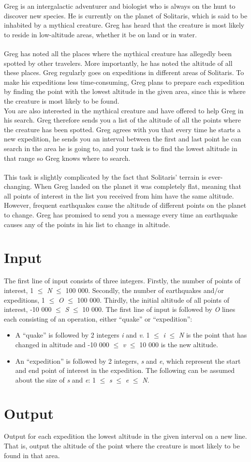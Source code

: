 Greg is an intergalactic adventurer and biologist who is always on the hunt to discover new species. He is currently on the planet of Solitaris, which is said to be inhabited by a mythical creature. Greg has heard that the creature is most likely to reside in low-altitude areas, whether it be on land or in water.
\\\\
Greg has noted all the places where the mythical creature has allegedly been spotted by other travelers. More importantly, he has noted the altitude of all these places. Greg regularly goes on expeditions in different areas of Solitaris. To make his expeditions less time-consuming, Greg plans to prepare each expedition by finding the point with the lowest altitude in the given area, since this is where the creature is most likely to be found. 
\\
You are also interested in the mythical creature and have offered to help Greg in his search. Greg therefore sends you a list of the altitude of all the points where the creature has been spotted. Greg agrees with you that every time he starts a new expedition, he sends you an interval between the first and last point he can search in the area he is going to, and your task is to find the lowest altitude in that range so Greg knows where to search.
\\\\
This task is slightly complicated by the fact that Solitaris' terrain is ever-changing. When Greg landed on the planet it was completely flat, meaning that all points of interest in the list you received from him have the same altitude. However, frequent earthquakes cause the altitude of different points on the planet to change. Greg has promised to send you a message every time an earthquake causes any of the points in his list to change in altitude.
\section*{Input}
The first line of input consists of three integers. Firstly, the number of points of interest, 1 $\leq$ \emph{N} $\leq$ 100 000. Secondly, the number of earthquakes and/or expeditions, 1 $\leq$ \emph{O} $\leq$ 100 000. Thirdly, the initial altitude of all points of interest, -10 000 $\leq$ \emph{S} $\leq$ 10 000. The first line of input is followed by \emph{O} lines each consisting of an operation, either “quake” or “expedition”:
\begin{itemize}
    \item A “quake” is followed by 2 integers \emph{i} and \emph{v}. 1 $\leq$ \emph{i} $\leq$ \emph{N} is the point that has changed in altitude and -10 000 $\leq$ \emph{v} $\leq$ 10 000 is the new altitude.
    \item An “expedition” is followed by 2 integers, \emph{s} and \emph{e}, which represent the start and end point of interest in the expedition. The following can be assumed about the size of \emph{s} and \emph{e}: 1 $\leq$ \emph{s} $\leq$ \emph{e} $\leq$ \emph{N}.
\end{itemize}
\section*{Output}
Output for each expedition the lowest altitude in the given interval on a new line. That is, output the altitude of the point where the creature is most likely to be found in that area.\\